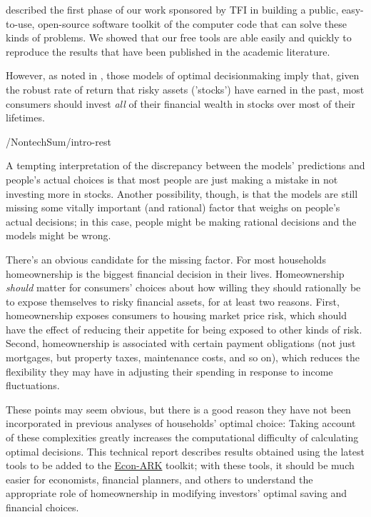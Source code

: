 \documentclass[PortfolioChoiceWithRiskyHousing]{subfiles}
\begin{document}
\cite{Carroll2020} described the first phase of our work sponsored by TFI in building a public, easy-to-use, open-source software toolkit of the computer code that can solve these kinds of problems.  We showed that our free tools are able easily and quickly to reproduce the results that have been published in the academic literature.

However, as noted in \cite{Carroll2020}, those models of optimal decisionmaking imply that, given the robust rate of return that risky assets ('stocks') have earned in the past, most consumers should invest \textit{all} of their financial wealth in stocks over most of their lifetimes.

\begin{verbatimwrite}{\LaTeXOutput/NontechSum/intro-rest}

  A tempting interpretation of the discrepancy between the models' predictions and people's actual choices is that most people are just making a mistake in not investing more in stocks. Another possibility, though, is that the models are still missing some vitally important (and rational) factor that weighs on people's actual decisions; in this case, people might be making rational decisions and the models might be wrong.

  There's an obvious candidate for the missing factor.  For most households homeownership is the biggest financial decision in their lives.  Homeownership \textit{should} matter for consumers' choices about how willing they should rationally be to expose themselves to risky financial assets, for at least two reasons.  First, homeownership exposes consumers to housing market price risk, which should have the effect of reducing their appetite for being exposed to other kinds of risk.  Second, homeownership is associated with certain payment obligations (not just mortgages, but property taxes, maintenance costs, and so on), which reduces the flexibility they may have in adjusting their spending in response to income fluctuations.

  These points may seem obvious, but there is a good reason they have not been incorporated in previous analyses of households' optimal choice:  Taking account of these complexities greatly increases the computational difficulty of calculating  optimal decisions.  This technical report describes results obtained using the latest tools to be added to the \href{https://econ-ark.org/}{Econ-ARK} toolkit; with these tools, it should be much easier for economists, financial planners, and others to understand the appropriate role of homeownership in modifying investors' optimal saving and financial choices.

\end{verbatimwrite}

\end{document}
